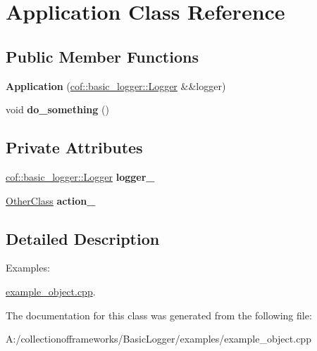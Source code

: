 \hypertarget{class_application}{}\section{Application Class Reference}
\label{class_application}
\subsection*{Public Member Functions}
\begin{DoxyCompactItemize}
\item 
\mbox{\label{class_application_a104f3b0bb3e7e04d509e82ca368f219b}} 
{\bfseries Application} (\hyperlink{classcof_1_1basic__logger_1_1_logger}{cof\+::basic\+\_\+logger\+::\+Logger} \&\&logger)
\item 
\mbox{\label{class_application_ae1b6d94aee757d3006b54dd97302e8da}} 
void {\bfseries do\+\_\+something} ()
\end{DoxyCompactItemize}
\subsection*{Private Attributes}
\begin{DoxyCompactItemize}
\item 
\mbox{\label{class_application_ad1eb950cf8bc4b29abc185351eb3f747}} 
\hyperlink{classcof_1_1basic__logger_1_1_logger}{cof\+::basic\+\_\+logger\+::\+Logger} {\bfseries logger\+\_\+}
\item 
\mbox{\label{class_application_a1118332c210291beed8c6db8cdd5fae1}} 
\hyperlink{class_other_class}{Other\+Class} {\bfseries action\+\_\+}
\end{DoxyCompactItemize}


\subsection{Detailed Description}
\begin{Desc}
\item[Examples\+: ]\par
\hyperlink{example_object_8cpp-example}{example\+\_\+object.\+cpp}.\end{Desc}


The documentation for this class was generated from the following file\+:\begin{DoxyCompactItemize}
\item 
A\+:/collectionofframeworks/\+Basic\+Logger/examples/example\+\_\+object.\+cpp\end{DoxyCompactItemize}
